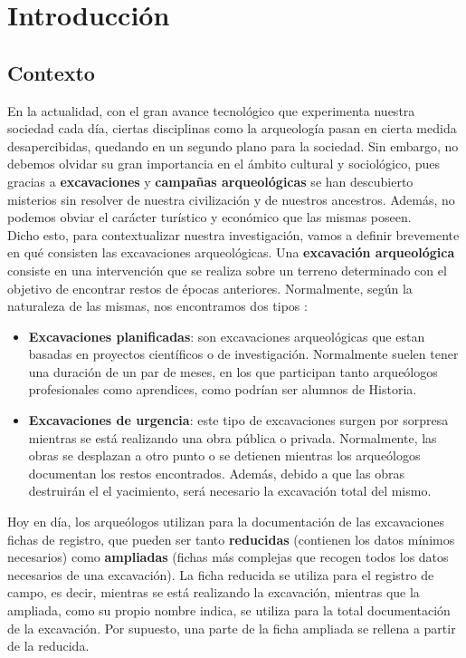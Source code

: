 \chapter{Introducción}
\section{Contexto}
En la actualidad, con el gran avance tecnológico que experimenta nuestra sociedad cada día,
ciertas disciplinas como la arqueología pasan en cierta medida desapercibidas, quedando en
un segundo plano para la sociedad. Sin embargo, no debemos olvidar su gran importancia en
el ámbito cultural y sociológico, pues gracias a \textbf{excavaciones} y \textbf{campañas
arqueológicas} se han descubierto misterios sin resolver de nuestra civilización y de
nuestros ancestros. Además, no podemos obviar el carácter turístico y económico que las
mismas poseen. \\

Dicho esto, para contextualizar nuestra investigación, vamos a definir brevemente en qué
consisten las excavaciones arqueológicas. Una \textbf{excavación arqueológica} consiste en
una intervención que se realiza sobre un terreno determinado con el objetivo de encontrar
restos de épocas anteriores. Normalmente, según la naturaleza de las mismas, nos encontramos
dos tipos \cite{excavation-type}:

    \begin{itemize}
        \item \textbf{Excavaciones planificadas}: son excavaciones arqueológicas que
        estan basadas en proyectos científicos o de investigación. Normalmente suelen
        tener una duración de un par de meses, en los que participan tanto arqueólogos
        profesionales como aprendices, como podrían ser alumnos de Historia.

        \item \textbf{Excavaciones de urgencia}: este tipo de excavaciones surgen por
        sorpresa mientras se está realizando una obra pública o privada. Normalmente,
        las obras se desplazan a otro punto o se detienen mientras los arqueólogos
        documentan los restos encontrados. Además, debido a que las obras destruirán el
        el yacimiento, será necesario la excavación total del mismo.\\
    \end{itemize}

Hoy en día, los arqueólogos utilizan para la documentación de las excavaciones fichas de
registro, que pueden ser tanto \textbf{reducidas} (contienen los datos mínimos necesarios)
como \textbf{ampliadas} (fichas más complejas que recogen todos los datos necesarios de una
excavación). La ficha reducida se utiliza para el registro de campo, es decir, mientras se
está realizando la excavación, mientras que la ampliada, como su propio nombre indica, se
utiliza para la total documentación de la excavación. Por supuesto, una parte de la ficha
ampliada se rellena a partir de la reducida. \\ 

